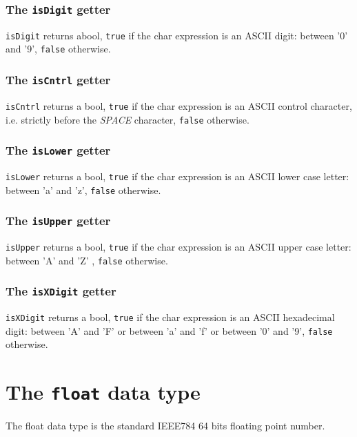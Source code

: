 \documentclass[10pt,openright,twosides]{report}
\newcommand{\gtltype}[1]{{\small\ttfamily #1}}
\newcommand{\ccst}[1]{{\footnotesize\ttfamily\colorbox{light-blue}{'#1'}}}
\newcommand{\gtlinline}[1]{\colorbox{light-blue}{\lstinline[language=gtl]{#1}}}
\begin{document}
\subsubsection{The \texttt{isDigit} getter}

\gtlinline{isDigit} returns abool, \gtlinline{true} if the char expression is an ASCII digit: between \ccst{0} and \ccst{9}, \gtlinline{false} otherwise.

\subsubsection{The \texttt{isCntrl} getter}

\gtlinline{isCntrl} returns a bool, \gtlinline{true} if the char expression is an ASCII control character, i.e. strictly before the {\em SPACE} character, \gtlinline{false} otherwise.

\subsubsection{The \texttt{isLower} getter}

\gtlinline{isLower} returns a bool, \gtlinline{true} if the char expression is an ASCII lower case letter: between \ccst{a} and \ccst{z}, \gtlinline{false} otherwise.

\subsubsection{The \texttt{isUpper} getter}

\gtlinline{isUpper} returns a bool, \gtlinline{true} if the char expression is an ASCII upper case letter: between \ccst{A} and \ccst{Z} , \gtlinline{false} otherwise.

\subsubsection{The \texttt{isXDigit} getter}

\gtlinline{isXDigit} returns a bool, \texttt{true} if the char expression is an ASCII hexadecimal digit: between \ccst{A} and \ccst{F} or between \ccst{a} and \ccst{f} or between \ccst{0} and \ccst{9}, \texttt{false} otherwise.
  
\section{The \texttt{float} data type}

The \gtltype{float} data type is the standard IEEE784 64 bits floating point number.
\end{document}
